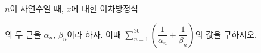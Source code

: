 $n$이 자연수일 때, $x$에 대한 이차방정식\par\smallskip{}\par\smallskip\noindent 의 두 근을 $\alpha_n$, $\beta_n$이라 하자. 이때 $\displaystyle\sum_{n=1}^{30}\left(\dfrac{1}{\alpha_n}+\dfrac{1}{\beta_n}\right)$의 값을 구하시오.

